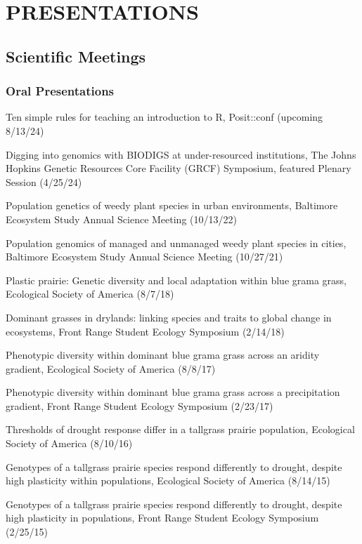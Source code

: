 \documentclass{cv}
\begin{document}
\section*{PRESENTATIONS}

\subsection*{Scientific Meetings}

\subsubsection*{Oral Presentations}

Ten simple rules for teaching an introduction to R, Posit::conf (upcoming 8/13/24)

Digging into genomics with BIODIGS at under-resourced institutions, The Johns Hopkins Genetic Resources Core Facility (GRCF) Symposium, featured Plenary Session (4/25/24)

Population genetics of weedy plant species in urban environments, Baltimore Ecosystem Study Annual Science Meeting (10/13/22)

Population genomics of managed and unmanaged weedy plant species in cities, Baltimore Ecosystem Study Annual Science Meeting (10/27/21)

Plastic prairie: Genetic diversity and local adaptation within blue grama grass, Ecological Society of America (8/7/18)

Dominant grasses in drylands: linking species and traits to global change in ecosystems, Front Range Student Ecology Symposium (2/14/18)

Phenotypic diversity within dominant blue grama grass across an aridity gradient, Ecological Society of America (8/8/17)

Phenotypic diversity within dominant blue grama grass across a precipitation gradient, Front Range Student Ecology Symposium (2/23/17)

Thresholds of drought response differ in a tallgrass prairie population, Ecological Society of America (8/10/16)

Genotypes of a tallgrass prairie species respond differently to drought, despite high plasticity within populations, Ecological Society of America (8/14/15)

Genotypes of a tallgrass prairie species respond differently to drought, despite high plasticity in populations, Front Range Student Ecology Symposium (2/25/15)
\end{document}
